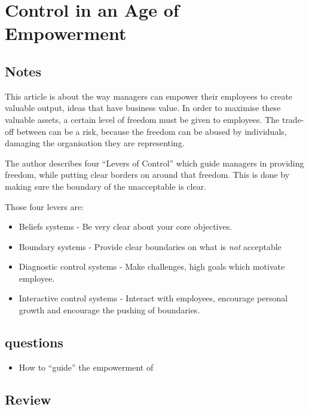 \chapter{Control in an Age of Empowerment \cite{simons1995control}}
\section{Notes}
This article is about the way managers can empower their employees to create valuable output, ideas that have business value.
In order to maximise these valuable assets, a certain level of freedom must be given to employees. 
The trade-off between can be a risk, because the freedom can be abused by individuals, damaging the organisation they are representing.

The author describes four ``Levers of Control'' which guide managers in providing freedom, while putting clear borders on around that freedom.
This is done by making sure the boundary of the unacceptable is clear.

Those four levers are:
\begin{itemize}
  \item Beliefs systems - Be very clear about your core objectives.
  \item Boundary systems - Provide clear boundaries on what is \emph{not} acceptable
  \item Diagnostic control systems - Make challenges, high goals which motivate employee.
  \item Interactive control systems - Interact with employees, encourage personal growth and encourage the pushing of boundaries.
\end{itemize}

\section{questions}
\begin{itemize}
  \item How to ``guide'' the empowerment of
\end{itemize}

\section{Review}
